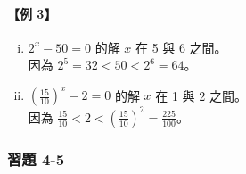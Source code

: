 \paragraph{【例 3】}
\begin{enumerate}[(i)]
    \item $2^x - 50 = 0$ 的解 $x$ 在 5 與 6 之間。\\
    因為 $2^5 = 32 < 50 < 2^6 = 64$。
    \item $\left(\frac{15}{10}\right)^x - 2 = 0$ 的解 $x$ 在 1 與 2 之間。\\
    因為 $\frac{15}{10} < 2 < \left(\frac{15}{10}\right)^2 = \frac{225}{100}$。
\end{enumerate}

\subsubsection*{習題 4-5}

